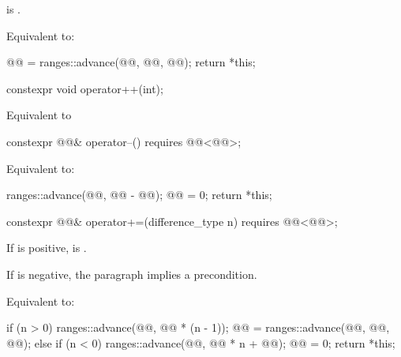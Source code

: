 \begin{itemdescr}
\pnum
\expects
{} is .

\pnum
\effects
Equivalent to:
\begin{codeblock}
@@ = ranges::advance(@@, @@, @@);
return *this;
\end{codeblock}
\end{itemdescr}

%
\begin{itemdecl}
constexpr void operator++(int);
\end{itemdecl}

\begin{itemdescr}
\pnum
\effects
Equivalent to 
\end{itemdescr}

%
\begin{itemdecl}
constexpr @@& operator--() requires @@<@@>;
\end{itemdecl}

\begin{itemdescr}
\pnum
\effects
Equivalent to:
\begin{codeblock}
ranges::advance(@@, @@ - @@);
@@ = 0;
return *this;
\end{codeblock}
\end{itemdescr}

%
\begin{itemdecl}
constexpr @@& operator+=(difference_type n) requires @@<@@>;
\end{itemdecl}

\begin{itemdescr}
\pnum
\expects
If  is positive,
is .
\begin{note}
If  is negative, the  paragraph implies a precondition.
\end{note}

\pnum
\effects
Equivalent to:
\begin{codeblock}
if (n > 0) {
  ranges::advance(@@, @@ * (n - 1));
  @@ = ranges::advance(@@, @@, @@);
} else if (n < 0) {
  ranges::advance(@@, @@ * n + @@);
  @@ = 0;
}
return *this;
\end{codeblock}
\end{itemdescr}

